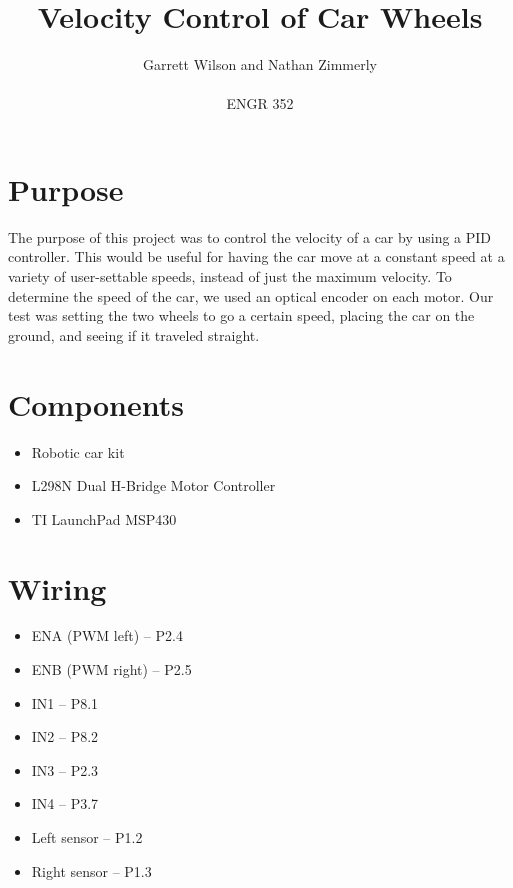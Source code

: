 \documentclass{article}
\begin{document}
\title{Velocity Control of Car Wheels}
\author{Garrett Wilson and Nathan Zimmerly \\ \\
ENGR 352}
\maketitle

\clearpage

\tableofcontents

\pagebreak

\section{Purpose}
The purpose of this project was to control the velocity of a car by using a PID controller. This would be useful for having the car move at a constant speed at a variety of user-settable speeds, instead of just the maximum velocity. To determine the speed of the car, we used an optical encoder on each motor. Our test was setting the two wheels to go a certain speed, placing the car on the ground, and seeing if it traveled straight.

\section{Components}
\begin{itemize}
\item Robotic car kit
\item L298N Dual H-Bridge Motor Controller
\item TI LaunchPad MSP430
\end{itemize}

\section{Wiring}
\begin{itemize}
\item ENA (PWM left) -- P2.4
\item ENB (PWM right) -- P2.5
\item IN1 -- P8.1
\item IN2 -- P8.2
\item IN3 -- P2.3
\item IN4 -- P3.7
\item Left sensor -- P1.2
\item Right sensor -- P1.3
\end{itemize}
\end{document}
